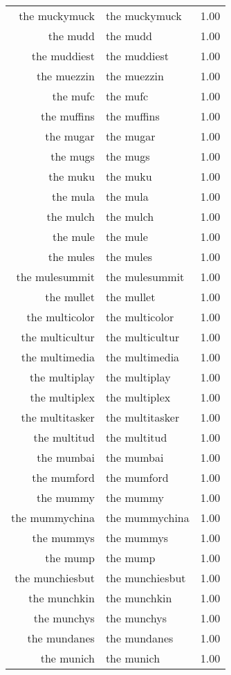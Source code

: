 \begin{table}[ht]
\begin{tabular}{rlr}
  the muckymuck & the muckymuck & 1.00 \\ 
  the mudd & the mudd & 1.00 \\ 
  the muddiest & the muddiest & 1.00 \\ 
  the muezzin & the muezzin & 1.00 \\ 
  the mufc & the mufc & 1.00 \\ 
  the muffins & the muffins & 1.00 \\ 
  the mugar & the mugar & 1.00 \\ 
  the mugs & the mugs & 1.00 \\ 
  the muku & the muku & 1.00 \\ 
  the mula & the mula & 1.00 \\ 
  the mulch & the mulch & 1.00 \\ 
  the mule & the mule & 1.00 \\ 
  the mules & the mules & 1.00 \\ 
  the mulesummit & the mulesummit & 1.00 \\ 
  the mullet & the mullet & 1.00 \\ 
  the multicolor & the multicolor & 1.00 \\ 
  the multicultur & the multicultur & 1.00 \\ 
  the multimedia & the multimedia & 1.00 \\ 
  the multiplay & the multiplay & 1.00 \\ 
  the multiplex & the multiplex & 1.00 \\ 
  the multitasker & the multitasker & 1.00 \\ 
  the multitud & the multitud & 1.00 \\ 
  the mumbai & the mumbai & 1.00 \\ 
  the mumford & the mumford & 1.00 \\ 
  the mummy & the mummy & 1.00 \\ 
  the mummychina & the mummychina & 1.00 \\ 
  the mummys & the mummys & 1.00 \\ 
  the mump & the mump & 1.00 \\ 
  the munchiesbut & the munchiesbut & 1.00 \\ 
  the munchkin & the munchkin & 1.00 \\ 
  the munchys & the munchys & 1.00 \\ 
  the mundanes & the mundanes & 1.00 \\ 
  the munich & the munich & 1.00 \\ 

\end{tabular}
\end{table}
